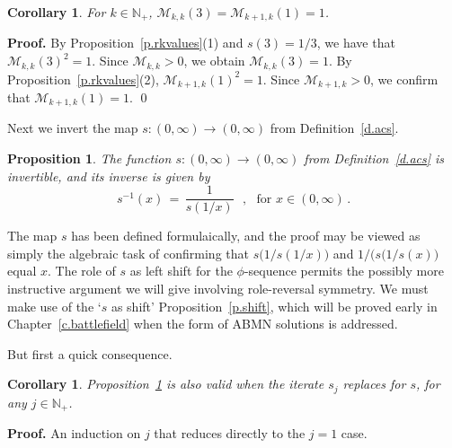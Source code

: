 \documentclass[letterpaper,11pt,oneside,reqno]{amsbook}
\newcommand{\N}{\ensuremath{\mathbb{N}}}
\numberwithin{figure}{chapter}
\newtheorem{proposition}[theorem]{Proposition}
\newtheorem{corollary}[theorem]{Corollary}
\theoremstyle{definition}
\theoremstyle{definition}
\theoremstyle{definition}
\theoremstyle{definition}
\theoremstyle{definition}
\newcommand{\nwithoutzero}{\N_+}
\newcommand{\minamm}{\mathcal{M}}
\newcommand{\abmnmacspace}{\textrm{ABMN} }
\begin{document}
 \begin{corollary}\label{c.rkvalues}
 For $k \in \nwithoutzero$, $\minamm_{k,k}(3) = \minamm_{k+1,k}(1) = 1$.
 \end{corollary}
 {\bf Proof.} By Proposition~\ref{p.rkvalues}(1) and $s(3) = 1/3$, we have that $\minamm_{k,k}(3)^2 = 1$. Since $\minamm_{k,k} > 0$, we obtain $\minamm_{k,k}(3) = 1$.
 By Proposition~\ref{p.rkvalues}(2), $\minamm_{k+1,k}(1)^2 = 1$. Since $\minamm_{k+1,k} > 0$, we confirm that $\minamm_{k+1,k}(1) = 1$. \qed
   
Next we invert the map $s:(0,\infty) \to (0,\infty)$ from Definition~\ref{d.acs}.    
 \begin{proposition}\label{p.sminusone}
 The function $s:(0,\infty) \to (0,\infty)$ from Definition~\ref{d.acs} is invertible, and its inverse is given by
 $$
 s^{-1}(x) \, = \, \frac{1}{s(1/x)} \, \, \, \, , \, \, \, \, \textrm{for $x \in (0,\infty)$} \, .
 $$
 \end{proposition}
 The map $s$ has been defined formulaically, and the proof may be viewed as simply the algebraic task of confirming that $s \big( 1/s(1/x) \big)$ and $1/\big(s(1/s(x)\big)$ equal $x$. 
 The role of $s$ as left shift for the $\phi$-sequence permits the possibly more instructive argument we will give involving role-reversal symmetry. We must make use of the `$s$ as shift' Proposition~\ref{p.shift}, which will be proved early in Chapter~\ref{c.battlefield} when the form of \abmnmacspace solutions is addressed.
 
 But first a quick consequence.
 \begin{corollary}\label{c.sminusone}
  Proposition~\ref{p.sminusone} is also valid when the iterate $s_j$ replaces for $s$, for any $j \in \nwithoutzero$.
 \end{corollary}
 {\bf Proof.} An induction on $j$ that reduces directly to the $j=1$ case.
 
\end{document}
